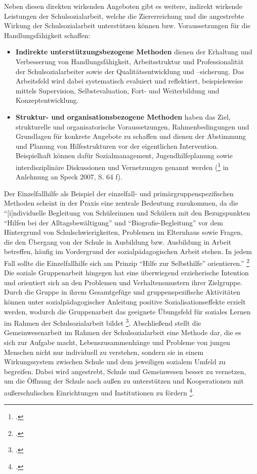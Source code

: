 \noindent
Neben diesen direkten wirkenden Angeboten gibt es weitere, indirekt wirkende Leistungen der Schulsozialarbeit, welche die Ziererreichung und die angestrebte Wirkung der Schulsozialarbeit unterstützen können bzw. Voraussetzungen für die Handlungsfähigkeit schaffen:\\
\begin{itemize}
	\item \textbf{Indirekte unterstützungsbezogene Methoden} dienen der Erhaltung und Verbesserung von Handlungsfähigkeit, Arbeitsstruktur und Professionalität der Schulsozialarbeiter sowie der Qualitätsentwicklung und –sicherung. Das Arbeitsfeld wird dabei systematisch evaluiert und reflektiert, beispielsweise mittels Supervision, Selbstevaluation, Fort- und Weiterbildung und Konzeptentwicklung. 
	\item \textbf{Struktur- und organisationsbezogene Methoden} haben das Ziel, strukturelle und organisatorische Voraussetzungen, Rahmenbedingungen und Grundlagen für konkrete Angebote zu schaffen und dienen der Abstimmung und Planung von Hilfestrukturen vor der eigentlichen Intervention. Beispielhaft können dafür Sozialmanagement, Jugendhilfeplanung sowie interdisziplinäre Diskussionen und Vernetzungen genannt werden (\footcite[vgl.][96ff]{Stuewe2015} in Anlehnung an Speck 2007, S. 64 f).
\end{itemize}

\noindent 
Der Einzelfallhilfe als Beispiel der einzelfall- und primärgruppenspezifischen Methoden scheint in der Praxis eine zentrale Bedeutung zuzukommen, da die "`[i]ndividuelle Begleitung von Schülerinnen und Schülern mit den Bezugspunkten "`Hilfen bei der Alltagsbewältigung"' und "`Biografie-Begleitung"' vor dem Hintergrund von Schulschwierigkeiten, Problemen im Elternhaus sowie Fragen, die den Übergang von der Schule in Ausbildung bzw. Ausbildung in Arbeit betreffen, häufig im Vordergrund der sozialpädagogischen Arbeit stehen. In jedem Fall sollte die Einzelfallhilfe sich am Prinzip "`Hilfe zur Selbsthilfe"' orientieren."' \footcite[23]{SMSSS2009} Die soziale Gruppenarbeit hingegen hat eine überwiegend erzieherische Intention und orientiert sich an den Problemen und Verhaltensmustern ihrer Zielgruppe. Durch die Gruppe in ihrem Gesamtgefüge und gruppenspezifische Aktivitäten können unter sozialpädagogischer Anleitung positive Sozialisationseffekte erzielt werden, wodurch die Gruppenarbeit das geeignete Übungsfeld für soziales Lernen im Rahmen der Schulsozialarbeit bildet \footcite[vgl.][24]{SMSSS2009}. Abschließend stellt die Gemeinwesenarbeit im Rahmen der Schulsozialarbeit eine Methode dar, die es sich zur Aufgabe macht, Lebenszusammenhänge und Probleme von jungen Menschen nicht nur individuell zu verstehen, sondern sie in einem Wirkungssystem zwischen Schule und dem jeweiligen sozialem Umfeld zu begreifen. Dabei wird angestrebt, Schule und Gemeinwesen besser zu vernetzen, um die Öffnung der Schule nach außen zu unterstützen und Kooperationen mit außerschulischen Einrichtungen und Institutionen zu fördern \footcite[vgl.][25]{SMSSS2009}. 

